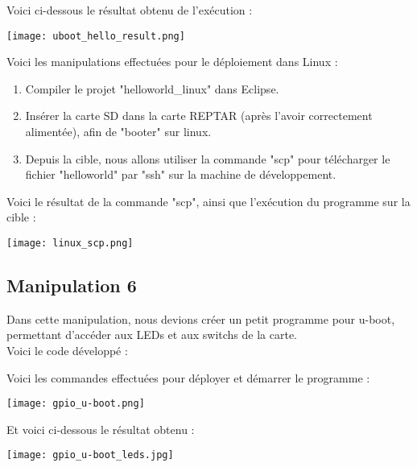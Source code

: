 Voici ci-dessous le résultat obtenu de l'exécution : 

\begin{center} 
\hspace{12.45cm}
\texttt{[image: uboot\_hello\_result.png]}
\end{center}
\vspace{1cm} 

\pagebreak

Voici les manipulations effectuées pour le déploiement dans Linux :
\begin{enumerate}
\item Compiler le projet "helloworld\_linux" dans Eclipse.
\item Insérer la carte SD dans la carte REPTAR (après l'avoir correctement alimentée), afin de "booter" sur linux.
\item Depuis la cible, nous allons utiliser la commande "scp" pour télécharger le fichier "helloworld" par "ssh" sur la machine de développement.
\end{enumerate}

Voici le résultat de la commande "scp", ainsi que l'exécution du programme sur la cible : 

\begin{center} 
\hspace{12.45cm}
\texttt{[image: linux\_scp.png]}
\end{center}
\vspace{1cm} 

\pagebreak
\subsection{Manipulation 6}

Dans cette manipulation, nous devions créer un petit programme pour u-boot, permettant d'accéder aux LEDs et aux switchs de la carte.\\

Voici le code développé : 


\vspace{1cm} 


Voici les commandes effectuées pour déployer et démarrer le programme :
\begin{center} 
\hspace{12.45cm}
\texttt{[image: gpio\_u-boot.png]}
\end{center}
\vspace{1cm} 
\pagebreak

Et voici ci-dessous le résultat obtenu :
\begin{center} 
\hspace{12.45cm}
\texttt{[image: gpio\_u-boot\_leds.jpg]}
\end{center}
\vspace{1cm} 
